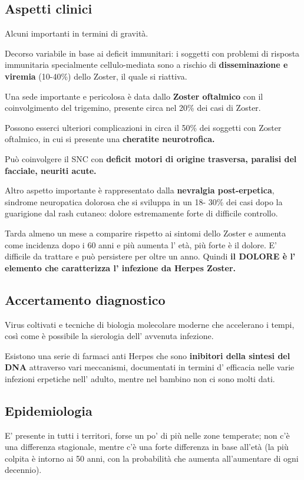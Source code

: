 \subsection{Aspetti clinici}

  Alcuni importanti in termini di gravità.

  Decorso variabile in base ai deficit immunitari: i soggetti con
  problemi di risposta immunitaria specialmente cellulo-mediata sono a
  rischio di \textbf{disseminazione e viremia} (10-40\%) dello Zoster,
  il quale si riattiva.

  Una sede importante e pericolosa è data dallo \textbf{Zoster
  oftalmico} con il coinvolgimento del trigemino, presente circa nel
  20\% dei casi di Zoster.

  Possono esserci ulteriori complicazioni in circa il 50\% dei soggetti
  con Zoster oftalmico, in cui si presente una \textbf{cheratite
  neurotrofica.}

  Può coinvolgere il SNC con \textbf{deficit motori di origine
  trasversa, paralisi del facciale, neuriti acute.}

  Altro aspetto importante è rappresentato dalla \textbf{nevralgia
  post-erpetica}, sindrome neuropatica dolorosa che si sviluppa in un
  18- 30\% dei casi dopo la guarigione dal rash cutaneo: dolore
  estremamente forte di difficile controllo.

  Tarda almeno un mese a comparire rispetto ai sintomi dello Zoster e
  aumenta come incidenza dopo i 60 anni e più aumenta l' età, più forte
  è il dolore. E' difficile da trattare e può persistere per oltre un
  anno. Quindi \textbf{il DOLORE è l' elemento che caratterizza l'
  infezione da Herpes Zoster.}

\subsection{Accertamento diagnostico}

  Virus coltivati e tecniche di biologia molecolare moderne che
  accelerano i tempi, così come è possibile la sierologia dell' avvenuta
  infezione.

  Esistono una serie di farmaci anti Herpes che sono \textbf{inibitori
  della sintesi del DNA} attraverso vari meccanismi, documentati in
  termini d' efficacia nelle varie infezioni erpetiche nell' adulto,
  mentre nel bambino non ci sono molti dati.

\subsection{Epidemiologia}
  E' presente in tutti i territori, forse un po' di più nelle zone
  temperate; non c'è una differenza stagionale, mentre c'è una forte
  differenza in base all'età (la più colpita è intorno ai 50 anni, con
  la probabilità che aumenta all'aumentare di ogni decennio).

